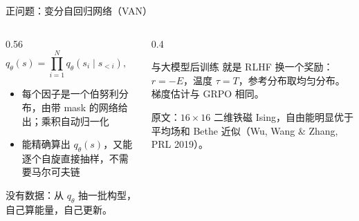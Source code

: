 \documentclass[aspectratio=169,10pt,UTF8,fontset=none]{ctexbeamer}
\begin{document}
\begin{frame}{正问题：变分自回归网络（VAN）}
  \begin{columns}[T]
    \begin{column}{0.56\textwidth}
      \[
        q_\theta(s)=\prod_{i=1}^Nq_\theta(s_i\mid s_{<i}),\qquad s_i=\pm1
      \]
      \begin{itemize}
        \item 每个因子是一个伯努利分布，由带 mask 的网络给出；乘积自动归一化
        \item 能精确算出 $q_\theta(s)$，又能逐个自旋直接抽样，不需要马尔可夫链
      \end{itemize}
      \begin{keystep}[训练：最小化变分自由能]
        没有数据：从 $q_\theta$ 抽一批构型，自己算能量，自己更新。
      \end{keystep}
    \end{column}
    \begin{column}{0.4\textwidth}
      \centering
      \par\vspace{1mm}
      {\scriptsize{}}
      \vspace{2mm}
      \begin{concept}{与大模型后训练}
        就是 RLHF 换一个奖励：$r=-E$，温度 $\tau=T$，参考分布取均匀分布。梯度估计与 GRPO 相同。
      \end{concept}
      \vspace{1mm}
      {\scriptsize 原文：$16\times16$ 二维铁磁 Ising，自由能明显优于平均场和 Bethe 近似（Wu, Wang \& Zhang, PRL 2019）。}
    \end{column}
  \end{columns}
\end{frame}
\end{document}
